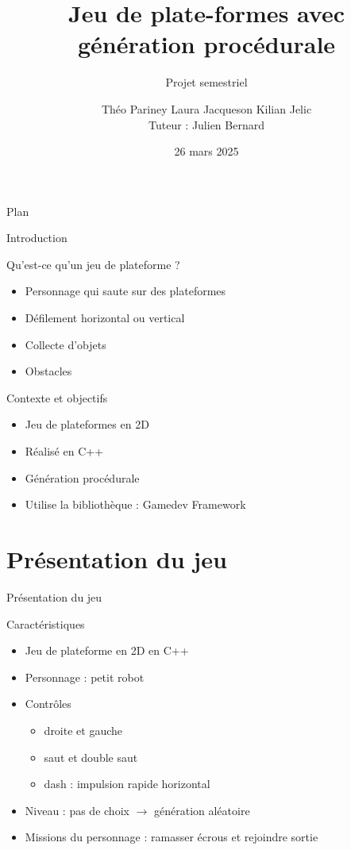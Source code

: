 \documentclass{beamer}
\title{Jeu de plate-formes avec génération procédurale}
\subtitle{Projet semestriel}
\author[T.Pariney L.Jaqueson K.Jelic]{Théo Pariney \newline Laura Jacqueson \newline Kilian Jelic\\\footnotesize Tuteur : Julien Bernard}
\institute[]{Université Marie et Louis Pasteur \\ \vspace{0.25cm} Licence 3 Informatique, 2024--2025}
\date{26 mars 2025}
\newcommand{\nologo}{\setbeamertemplate{logo}{}}
\begin{document}
\begin{frame}
    \titlepage
\end{frame}

{\nologo

\begin{frame}{Plan}
    \tableofcontents
\end{frame}

\begin{frame}{Introduction}
    \begin{block}{Qu'est-ce qu'un jeu de plateforme ?}
       \begin{itemize}
            \item[\bullet] Personnage qui saute sur des plateformes
            \item[\bullet] Défilement horizontal ou vertical
            \item[\bullet] Collecte d'objets
            \item[\bullet] Obstacles
        \end{itemize}
    \end{block}
    \begin{block}{Contexte et objectifs}
        \begin{itemize}
            \item[\bullet] Jeu de plateformes en 2D
            \item[\bullet] Réalisé en C++
            \item[\bullet] Génération procédurale
            \item[\bullet] Utilise la bibliothèque : Gamedev Framework
        \end{itemize}
    \end{block}
\end{frame}

\section{Présentation du jeu}
\begin{frame}{Présentation du jeu}
    \begin{block}{Caract\'eristiques}
        \begin{itemize}
            \item[\bullet] Jeu de plateforme en 2D en C++
            \item[\bullet] Personnage : petit robot
            \item[\bullet] Contrôles
            \begin{itemize}
                \item droite et gauche
                \item saut et double saut
                \item dash : impulsion rapide horizontal
            \end{itemize}
            \item[\bullet] Niveau : pas de choix $\rightarrow$ génération aléatoire
            \item[\bullet] Missions du personnage : ramasser écrous et rejoindre sortie
        \end{itemize}
    \end{block}
\end{frame}

}
\end{document}
